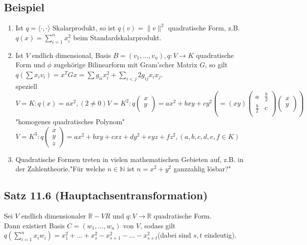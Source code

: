 \documentclass[a4paper, 12pt]{extarticle}
\newcommand{\norm}[1]{
	\parallel #1 \parallel
}
\newcommand{\skalar}[2] {
	\langle #1, #2\rangle
}
\begin{document}
\subsection*{Beispiel}
\begin{enumerate}
	\item Ist $q = \skalar{\cdot}{\cdot}$ Skalarprodukt, so ist $q(v)= \norm{v}^2$ quadratische Form, z.B. $q(x) = \sum_{i=1}^{n}x_i^2$ beim Standardskalarprodukt.
	\item Ist $V$ endlich dimensional, Basis $B=(v_1,...,v_n), q:V\longrightarrow K$ quadratische Form und $\phi$ zugehörige Bilinearform mit Gram'scher Matrix $G$, so gilt \\
	$q(\sum x_iv_i)=x^TGx = \sum g_{ii}x_i^2 + \sum_{i<j}2g_{ij}x_ix_j$.\\
	speziell $V=K: q(x) =ax^2, (2 \neq 0) V= K^2: q\left(\begin{matrix}x \\y\\ \end{matrix} \right) = ax^2 + bxy + cy^2 \left(=(xy)\left(\begin{matrix}
		a & \frac{b}{2}\\
		\frac{b}{2} & c \\
	\end{matrix}\right) \left(\begin{matrix}
		x \\ y \\ \end{matrix}\right)\right)$\\
	"homogenes quadratisches Polynom"$V = K^3 : q\left(\begin{matrix}x \\ y \\ z\end{matrix}\right) = ax^2 + bxy + cxz + dy^2 + eyz + fz^2, (a,b,c,d,e,f \in K)$
	\item Quadratische Formen treten in vielen mathematischen Gebieten auf, z.B. in der Zahlentheorie."Für welche $n\in \mathbb{N}$ ist $n = x^2 + y^2$ ganzzahlig lösbar?"
\end{enumerate}
\subsection*{Satz 11.6 (Hauptachsentransformation)}
Sei $V$ endlich dimensionaler $\mathbb{R} - VR$ und $q: V\longrightarrow \mathbb{R}$ quadratische Form.\\
Dann existiert Basis $C = (w_1,...,w_n)$ von $V$, sodass gilt \\
$q(\sum_{i=1}^{n}x_iw_i) = x_1^2 + ... + x_s^2 - x_{s+1}^2 - ... - x_{s+t}^2$(dabei sind $s,t$ eindeutig).
\end{document}
